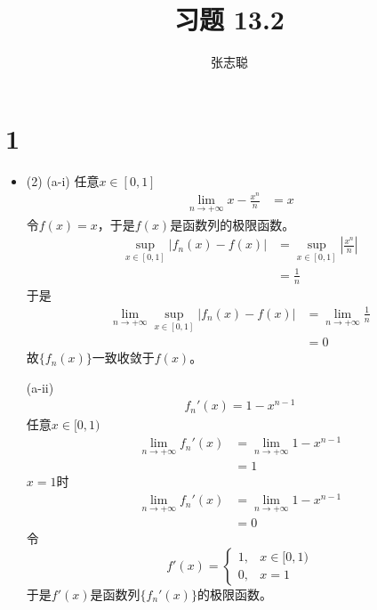 \documentclass{article}
\begin{document}
\title{习题 13.2}
\author{张志聪}
\maketitle

\section*{1}
\begin{itemize}
  \item  (2)
        (a-i)
        任意$x \in [0, 1]$
        \begin{align*}
          \lim\limits_{n \to +\infty} x - \frac{x^n}{n}
           & = x
        \end{align*}
        令$f(x) = x$，于是$f(x)$是函数列的极限函数。
        \begin{align*}
          \sup\limits_{x \in [0, 1]} |f_n(x) - f(x)|
           & = \sup\limits_{x \in [0, 1]} \left|\frac{x^n}{n} \right| \\
           & = \frac{1}{n}
        \end{align*}
        于是
        \begin{align*}
          \lim\limits_{n \to +\infty} \sup\limits_{x \in [0, 1]} |f_n(x) - f(x)|
           & = \lim\limits_{n \to +\infty} \frac{1}{n} \\
           & = 0
        \end{align*}
        故$\{f_n(x)\}$一致收敛于$f(x)$。

        (a-ii)
        \begin{align*}
          f_n'(x) = 1 - x^{n - 1}
        \end{align*}
        任意$x \in [0, 1)$
        \begin{align*}
          \lim\limits_{n \to +\infty} f_n'(x)
           & = \lim\limits_{n \to +\infty} 1 - x^{n - 1} \\
           & = 1
        \end{align*}
        $x = 1$时
        \begin{align*}
          \lim\limits_{n \to +\infty} f_n'(x)
           & = \lim\limits_{n \to +\infty} 1 - x^{n - 1} \\
           & = 0
        \end{align*}
        令
        \begin{equation*}
          f'(x) = \begin{cases}
            1, & x \in [0, 1) \\
            0, & x = 1
          \end{cases}
        \end{equation*}
        于是$f'(x)$是函数列$\{f_n'(x)\}$的极限函数。


\end{itemize}
\end{document}
